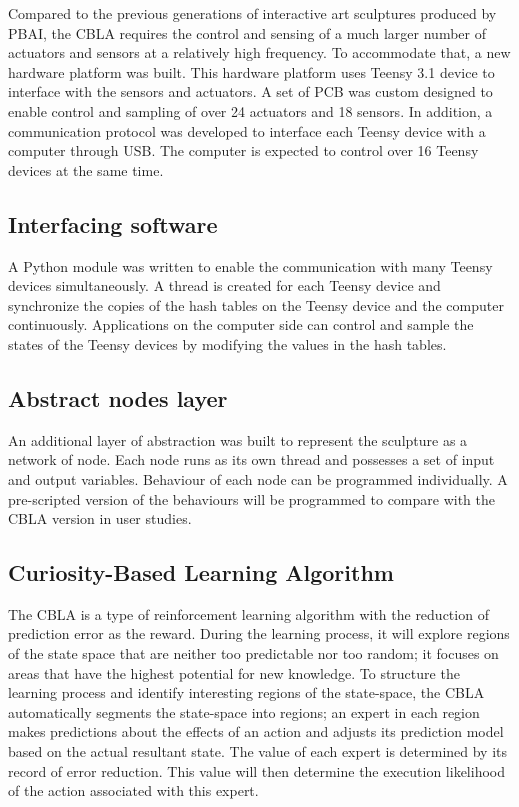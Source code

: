 Compared to the previous generations of interactive art sculptures produced by PBAI, the CBLA requires the control and sensing of a much larger number of actuators and sensors at a relatively high frequency. To accommodate that, a new hardware platform was built. This hardware platform uses Teensy 3.1 device to interface with the sensors and actuators. A set of PCB was custom designed to enable control and sampling of over 24 actuators and 18 sensors. In addition, a communication protocol was developed to interface each Teensy device with a computer through USB. The computer is expected to control over 16 Teensy devices at the same time.

\subsection{Interfacing software}

A Python module was written to enable the communication with many Teensy devices simultaneously. A thread is created for each Teensy device and synchronize the copies of the hash tables on the Teensy device and the computer continuously. Applications on the computer side can control and sample the states of the Teensy devices by modifying the values in the hash tables.

\subsection{Abstract nodes layer}

An additional layer of abstraction was built to represent the sculpture as a network of node. Each node runs as its own thread and possesses a set of input and output variables. Behaviour of each node can be programmed individually. A pre-scripted version of the behaviours will be programmed to compare with the CBLA version in user studies.

\subsection{Curiosity-Based Learning Algorithm}

The CBLA is a type of reinforcement learning algorithm with the reduction of prediction error as the reward. During the learning process, it will explore regions of the state space that are neither too predictable nor too random; it focuses on areas that have the highest potential for new knowledge. To structure the learning process and identify interesting regions of the state-space, the CBLA automatically segments the state-space into regions; an expert in each region makes predictions about the effects of an action and adjusts its prediction model based on the actual resultant state. The value of each expert is determined by its record of error reduction. This value will then determine the execution likelihood of the action associated with this expert.

